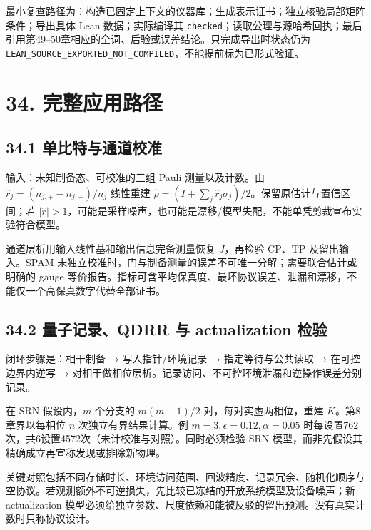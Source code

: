\documentclass[
  11pt,
  oneside]{book}
\begin{document}
最小复查路径为：构造已固定上下文的仪器库；生成表示证书；独立核验局部矩阵条件；导出具体
Lean 数据；实际编译其
\texttt{checked}；读取公理与源哈希回执；最后引用第49--50章相应的全词、后验或误差结论。只完成导出时状态仍为
\texttt{LEAN\_\allowbreak SOURCE\_\allowbreak EXPORTED\_\allowbreak NOT\_\allowbreak COMPILED}，不能提前标为已形式验证。

\hypertarget{ch-34}{%
\chapter{34. 完整应用路径}\label{ch-34}}

\hypertarget{ux5355ux6bd4ux7279ux4e0eux901aux9053ux6821ux51c6}{%
\section{34.1
单比特与通道校准}\label{ux5355ux6bd4ux7279ux4e0eux901aux9053ux6821ux51c6}}

输入：未知制备态、可校准的三组 Pauli 测量以及计数。由
\(\hat r_j=(n_{j,+}-n_{j,-})/n_j\) 线性重建
\(\hat\rho=(I+\sum_j\hat r_j\sigma_j)/2\)。保留原估计与置信区间；若
\(|\hat r|>1\)，可能是采样噪声，也可能是漂移/模型失配，不能单凭剪裁宣布实验符合模型。

通道层析用输入线性基和输出信息完备测量恢复 \(J\)，再检验 CP、TP
及留出输入。SPAM
未独立校准时，门与制备测量的误差不可唯一分解；需要联合估计或明确的 gauge
等价报告。指标可含平均保真度、最坏协议误差、泄漏和漂移，不能仅一个高保真数字代替全部证书。

\hypertarget{ux91cfux5b50ux8bb0ux5f55qdrr-ux4e0e-actualization-ux68c0ux9a8c}{%
\section{34.2 量子记录、QDRR 与 actualization
检验}\label{ux91cfux5b50ux8bb0ux5f55qdrr-ux4e0e-actualization-ux68c0ux9a8c}}

闭环步骤是：相干制备 → 写入指针/环境记录 → 指定等待与公共读取 →
在可控边界内逆写 →
对相干做相位层析。记录访问、不可控环境泄漏和逆操作误差分别记录。

在 SRN 假设内，\(m\) 个分支的 \(m(m-1)/2\) 对，每对实虚两相位，重建
\(K\)。第8章界以每相位 \(n\) 次独立有界结果计算。例
\(m=3,\epsilon=0.12,\alpha=0.05\)
时每设置762次，共6设置4572次（未计校准与对照）。同时必须检验 SRN
模型，而非先假设其精确成立再宣称发现或排除新物理。

关键对照包括不同存储时长、环境访问范围、回波精度、记录冗余、随机化顺序与空协议。若观测额外不可逆损失，先比较已冻结的开放系统模型及设备噪声；新
actualization
模型必须给独立参数、尺度依赖和能被反驳的留出预测。没有真实计数时只称协议设计。
\end{document}
